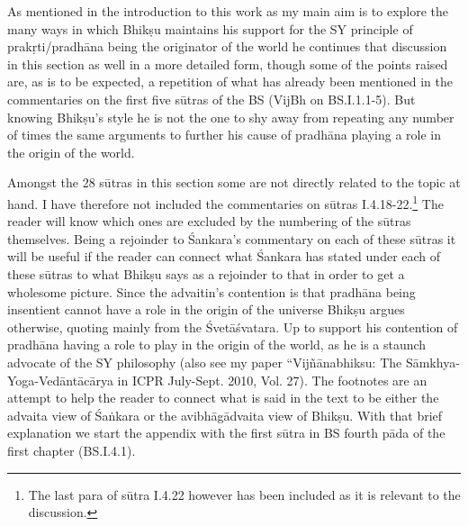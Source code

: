 As mentioned in the introduction to this work as my main aim is to explore the many ways in which Bhikṣu maintains his support for the SY principle of prakṛti/pradhāna being the originator of the world he continues that discussion in this section as well in a more detailed form, though some of the points raised are, as is to be expected, a repetition of what has already been mentioned in the commentaries on the first five sūtras of the BS (VijBh on BS.I.1.1-5). But knowing Bhikṣu’s style he is not the one to shy away from repeating any number of times the same arguments to further his cause of pradhāna playing a role in the origin of the world.

Amongst the 28 sūtras in this section some are not directly related to the topic at hand. I have therefore not included     the commentaries on sūtras I.4.18-22.\footnote{The last para of sūtra I.4.22 however has been included as it is relevant to the discussion.} The reader will know which ones are excluded by the numbering of the sūtras themselves. Being a rejoinder to Śankara’s commentary on each of these sūtras it will be useful if the reader can connect what Śankara has stated under each of these sūtras to what Bhikṣu says as a rejoinder to that in order to get a wholesome picture.  Since the advaitin’s contention is that pradhāna being insentient cannot have a role in the origin of the universe Bhikṣu argues otherwise, quoting mainly from the Śvetāśvatara. Up to support his contention of pradhāna having a role to play in the origin of the world, as he is a staunch advocate of the SY philosophy (also see my paper  “Vijñānabhiksu: The Sāmkhya-Yoga-Vedāntācārya in ICPR July-Sept. 2010, Vol. 27).  The footnotes are an attempt to help the reader to connect what is said in the text to be either the advaita view of Śaṅkara or the avibhāgādvaita view  of   Bhikṣu.  With that brief explanation we start the appendix with the first sūtra in BS fourth pāda of the first chapter (BS.I.4.1).



